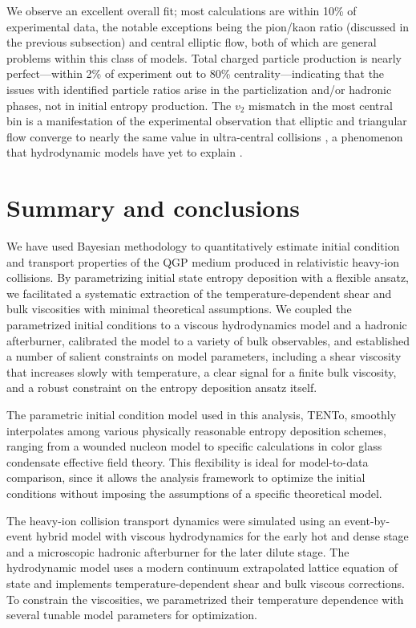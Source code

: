 \documentclass[aps,prc,reprint,amsmath,nofootinbib]{revtex4-1}
\newcommand{\trento}{T\raisebox{-0.5ex}{R}ENTo}
\begin{document}
We observe an excellent overall fit; most calculations are within 10\% of experimental data, the notable exceptions being the pion/kaon ratio (discussed in the previous subsection) and central elliptic flow, both of which are general problems within this class of models.
Total charged particle production is nearly perfect---within 2\% of experiment out to 80\% centrality---indicating that the issues with identified particle ratios arise in the particlization and/or hadronic phases, not in initial entropy production.
The $v_2$ mismatch in the most central bin is a manifestation of the experimental observation that elliptic and triangular flow converge to nearly the same value in ultra-central collisions \cite{CMS:2013bza}, a phenomenon that hydrodynamic models have yet to explain \cite{Denicol:2014ywa,Shen:2015qta}.


\section{Summary and conclusions}

We have used Bayesian methodology to quantitatively estimate initial condition and transport properties of the QGP medium produced in relativistic heavy-ion collisions.
By parametrizing initial state entropy deposition with a flexible ansatz, we facilitated a systematic extraction of the temperature-dependent shear and bulk viscosities with minimal theoretical assumptions.
We coupled the parametrized initial conditions to a viscous hydrodynamics model and a hadronic afterburner, calibrated the model to a variety of bulk observables, and established a number of salient constraints on model parameters, including a shear viscosity that increases slowly with temperature, a clear signal for a finite bulk viscosity, and a robust constraint on the entropy deposition ansatz itself.

The parametric initial condition model used in this analysis, \trento, smoothly interpolates among various physically reasonable entropy deposition schemes, ranging from a wounded nucleon model to specific calculations in color glass condensate effective field theory.
This flexibility is ideal for model-to-data comparison, since it allows the analysis framework to optimize the initial conditions without imposing the assumptions of a specific theoretical model.

The heavy-ion collision transport dynamics were simulated using an event-by-event hybrid model with viscous hydrodynamics for the early hot and dense stage and a microscopic hadronic afterburner for the later dilute stage.
The hydrodynamic model uses a modern continuum extrapolated lattice equation of state and implements temperature-dependent shear and bulk viscous corrections.
To constrain the viscosities, we parametrized their temperature dependence with several tunable model parameters for optimization.
\end{document}
